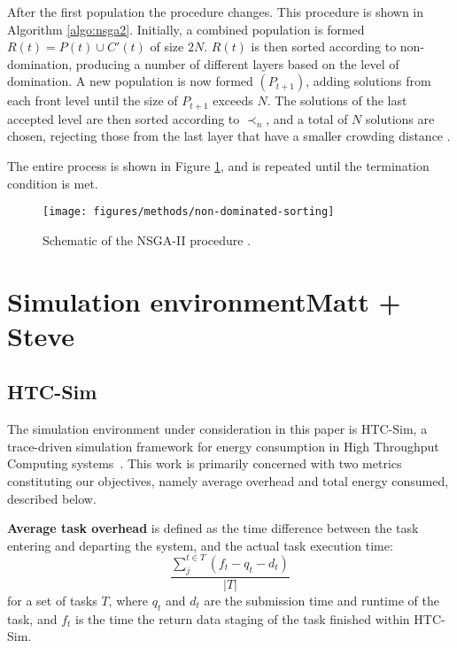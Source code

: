 \documentclass[10pt, conference, compsocconf]{IEEEtran}
\begin{document}
After the first population the procedure changes. This procedure is shown in Algorithm \ref{algo:nsga2}. Initially, a combined population is formed $R(t)=P(t) \cup C'(t)$ of size $2N$. $R(t)$ is then sorted according to non-domination, producing a number of different layers based on the level of domination. A new population is now formed $(P_{t+1})$, adding solutions from each front level until the size of $P_{t+1}$ exceeds $N$. The solutions of the last accepted level are then sorted according to $\prec_n$, and a total of $N$ solutions are chosen, rejecting those from the last layer that have a smaller crowding distance \cite{Valkanas2014}.

The entire process is shown in Figure \ref{fig:nsga2-schematic}, and is repeated until the termination condition is met.

\begin{figure}
  \texttt{[image: figures/methods/non-dominated-sorting]}
  \caption{Schematic of the NSGA-II procedure \cite{Deb2001}.}
  \label{fig:nsga2-schematic}
\end{figure}




\section{Simulation environment{\color{red}Matt + Steve}}
\label{environment}

\subsection{HTC-Sim}
The simulation environment under consideration in this paper is HTC-Sim, a trace-driven simulation framework for energy consumption in High Throughput Computing systems~\cite{htc-sim}. This work is primarily concerned with two metrics constituting our objectives, namely average overhead and total energy consumed, described below.

\textbf{Average task overhead} is defined as the time difference between the task entering and departing the system, and the actual task execution time:%
\[\frac{\sum_{j}^{t \in T} (f_{t} - q_{t} - d_{t})}{|T|}\]
\noindent for a set of tasks $T$, where $q_{t}$ and $d_{t}$ are the submission time and runtime of the task, and $f_t$ is the time the return data staging of the task finished within HTC-Sim.%
\end{document}
